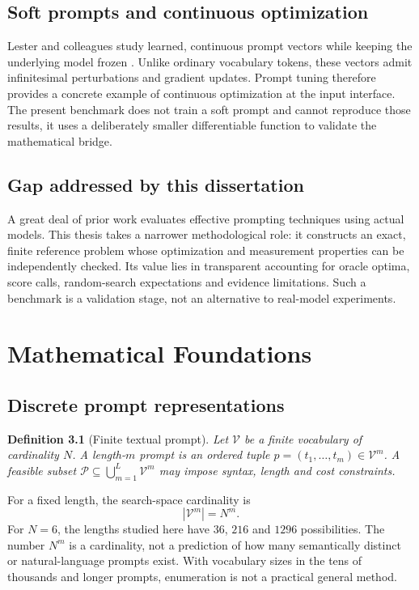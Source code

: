 \documentclass[12pt,a4paper,oneside]{report}
\newtheorem{definition}[theorem]{Definition}
\newcommand{\Vocab}{\mathcal V}
\newcommand{\Pspace}{\mathcal P}
\begin{document}
\section{Soft prompts and continuous optimization}
Lester and colleagues study learned, continuous prompt vectors while keeping the underlying model frozen \cite{lester2021}. Unlike ordinary vocabulary tokens, these vectors admit infinitesimal perturbations and gradient updates. Prompt tuning therefore provides a concrete example of continuous optimization at the input interface. The present benchmark does not train a soft prompt and cannot reproduce those results, it uses a deliberately smaller differentiable function to validate the mathematical bridge.

\section{Gap addressed by this dissertation}
A great deal of prior work evaluates effective prompting techniques using actual models. This thesis takes a narrower methodological role: it constructs an exact, finite reference problem whose optimization and measurement properties can be independently checked. Its value lies in transparent accounting for oracle optima, score calls, random-search expectations and evidence limitations. Such a benchmark is a validation stage, not an alternative to real-model experiments.

\chapter{Mathematical Foundations}
\section{Discrete prompt representations}
\begin{definition}[Finite textual prompt]
Let $\Vocab$ be a finite vocabulary of cardinality $N$. A length-$m$ prompt is an ordered tuple $p=(t_1,\dots,t_m)\in\Vocab^m$. A feasible subset $\Pspace\subseteq\bigcup_{m=1}^{L}\Vocab^m$ may impose syntax, length and cost constraints.
\end{definition}
For a fixed length, the search-space cardinality is
\begin{equation}|\Vocab^m|=N^m.\label{eq:count}\end{equation}
For $N=6$, the lengths studied here have $36$, $216$ and $1296$ possibilities. The number $N^m$ is a cardinality, not a prediction of how many semantically distinct or natural-language prompts exist. With vocabulary sizes in the tens of thousands and longer prompts, enumeration is not a practical general method.
\end{document}
